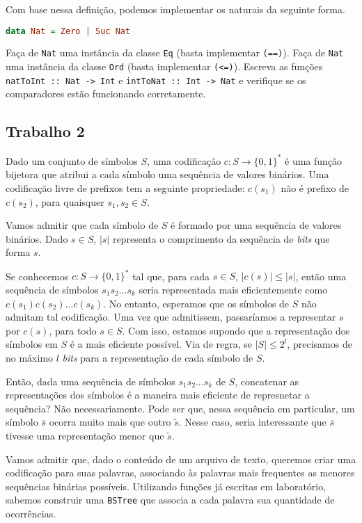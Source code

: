 \documentclass[a4paper]{article}
\begin{document}
Com base nessa definição, podemos implementar os naturais da seguinte forma.

\begin{lstlisting}[language=haskell, frame=single]
data Nat = Zero | Suc Nat
\end{lstlisting}

Faça de \texttt{Nat} uma instância da classe \texttt{Eq} (basta implementar \texttt{(==)}).
Faça de \texttt{Nat} uma instância da classe \texttt{Ord} (basta implementar \texttt{(<=)}).
Escreva as funções \texttt{natToInt :: Nat -> Int} e \texttt{intToNat :: Int -> Nat} e verifique se os comparadores estão funcionando corretamente.

\subsection{Trabalho 2}

Dado um conjunto de símbolos $S$, uma codificação $c : S \to \{0, 1\}^*$ é uma função bijetora que atribui a cada símbolo uma sequência de valores binários.
Uma codificação livre de prefixos tem a seguinte propriedade: $c(s_1)$ não é prefixo de $c(s_2)$, para quaisquer $s_1, s_2 \in S$.

Vamos admitir que cada símbolo de $S$ é formado por uma sequência de valores binários.
Dado $s \in S$, $|s|$ representa o comprimento da sequência de \emph{bits} que forma $s$.

Se conhecemos $c : S \to \{0, 1\}^*$ tal que, para cada $s \in S$, $|c(s)| \leq |s|$, então uma sequência de símbolos $s_1s_2\dots s_k$ seria representada mais eficientemente como $c(s_1)c(s_2)\dots c(s_k)$.
No entanto, esperamos que os símbolos de $S$ não admitam tal codificação.
Uma vez que admitissem, passaríamos a representar $s$ por $c(s)$, para todo $s \in S$.
Com isso, estamos supondo que a representação dos símbolos em $S$ é a mais eficiente possível.
Via de regra, se $|S| \leq 2^l$, precisamos de no máximo $l$ \emph{bits} para a representação de cada símbolo de $S$.

Então, dada uma sequência de símbolos $s_1s_2 \dots s_k$ de $S$, concatenar as representações dos símbolos é a maneira mais eficiente de represnetar a sequência?
Não necessariamente.
Pode ser que, nessa sequência em particular, um símbolo $\overline{s}$ ocorra muito mais que outro $\tilde{s}$.
Nesse caso, seria interessante que $\overline{s}$ tivesse uma representação menor que $\tilde{s}$.

Vamos admitir que, dado o conteúdo de um arquivo de texto, queremos criar uma codificação para suas palavras, associando às palavras mais frequentes as menores sequências binárias possíveis.
Utilizando funções já escritas em laboratório, sabemos construir uma \texttt{BSTree} que associa a cada palavra sua quantidade de ocorrências.
\end{document}
